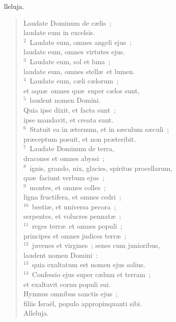 \bchapter
{}lleluja. \begin{flushleft}\begin{verse}\vspace{6pt}Laudate Dominum de c\ae lis~;\\ laudate eum in excelsis.\\
${}^{2}$~Laudate eum, omnes angeli ejus~;\\ laudate eum, omnes virtutes ejus.\\
${}^{3}$~Laudate eum, sol et luna~;\\ laudate eum, omnes stell\ae\ et lumen.\\
${}^{4}$~Laudate eum, c\ae li c\ae lorum~;\\ et aqu\ae\ omnes qu\ae\ super c\ae los sunt,\\
${}^{5}$~laudent nomen Domini.\\ Quia ipse dixit, et facta sunt~;\\ ipse mandavit, et creata sunt.\\
${}^{6}$~Statuit ea in \ae ternum, et in s\ae culum s\ae culi~;\\ pr\ae ceptum posuit, et non pr\ae teribit.\\
${}^{7}$~Laudate Dominum de terra,\\ dracones et omnes abyssi~;\\
${}^{8}$~ignis, grando, nix, glacies, spiritus procellarum,\\ qu\ae\ faciunt verbum ejus~;\\
${}^{9}$~montes, et omnes colles~;\\ ligna fructifera, et omnes cedri~;\\
${}^{10}$~besti\ae , et universa pecora~;\\ serpentes, et volucres pennat\ae~;\\
${}^{11}$~reges terr\ae\ et omnes populi~;\\ principes et omnes judices terr\ae~;\\
${}^{12}$~juvenes et virgines~; senes cum junioribus,\\ laudent nomen Domini~:\\
${}^{13}$~quia exaltatum est nomen ejus solius.\\
${}^{14}$~Confessio ejus super c\ae lum et terram~;\\ et exaltavit cornu populi sui.\\ Hymnus omnibus sanctis ejus~;\\ filiis Isra\"el, populo appropinquanti sibi.\\ Alleluja.\end{verse}\end{flushleft}



